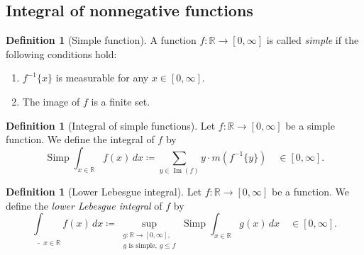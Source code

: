 \documentclass{article}
\theoremstyle{definition}
\newtheorem{definition}[theorem]{Definition}
\newtheorem{exercise}[theorem]{Exercise}
\DeclareMathOperator{\Img}{Im}
\DeclareMathOperator{\Simp}{Simp}
\begin{document}

\subsection{Integral of nonnegative functions}

\begin{definition}[Simple function]
  A function $f : \mathbb{R} \to [0, \infty]$ is called \emph{simple} if
  the following conditions hold:
  \begin{enumerate}
    \item $f^{-1} \{x\}$ is measurable for any $x \in [0, \infty]$.
    \item The image of $f$ is a finite set.
  \end{enumerate}
\end{definition}


\begin{definition}[Integral of simple functions]
  Let $f : \mathbb{R} \to [0, \infty]$ be a simple function.
  We define the integral of $f$ by
  \begin{equation*}
    \Simp \int_{x \in \mathbb{R}} f(x) \, dx 
      \coloneqq \sum_{y \in \Img (f)}
        y \cdot m(f^{-1}\{y\}) \quad \in [0, \infty].
  \end{equation*}
\end{definition}

\begin{definition}[Lower Lebesgue integral]
  Let $f : \mathbb{R} \to [0, \infty]$ be a function.
  We define the \emph{lower Lebesgue integral} of $f$ by
  \begin{equation*}
    \underline{\int}_{x \in \mathbb{R}} f(x) \, dx 
      \coloneqq \sup_{\substack{g : \mathbb{R} \to [0, \infty],\\ \text{$g$ is simple},\, g \leq f}}
        \Simp \int_{x \in \mathbb{R}} g(x) \, dx \quad \in [0, \infty].
  \end{equation*}
\end{definition}
\end{document}

